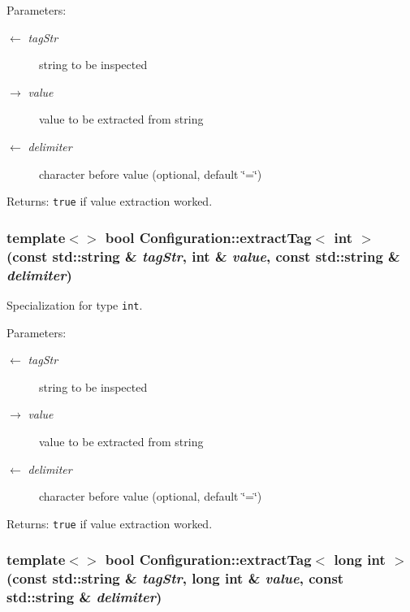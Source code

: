 \begin{Desc}
\item[Parameters:]
\begin{description}
\item[\mbox{$\leftarrow$} {\em tag\-Str}]string to be inspected \item[\mbox{$\rightarrow$} {\em value}]value to be extracted from string \item[\mbox{$\leftarrow$} {\em delimiter}]character before value (optional, default \char`\"{}=\char`\"{})\end{description}
\end{Desc}
\begin{Desc}
\item[Returns:]{\tt true} if value extraction worked. \end{Desc}
\hypertarget{namespaceConfiguration_76bd2eb20a53277e56bb0149ef306281}{
\subsubsection[extractTag]{\setlength{\rightskip}{0pt plus 5cm}template$<$$>$ bool Configuration::extract\-Tag$<$ int $>$ (const std::string \& {\em tag\-Str}, int \& {\em value}, const std::string \& {\em delimiter})}}
\label{namespaceConfiguration_76bd2eb20a53277e56bb0149ef306281}


Specialization for type {\tt int}. 

\begin{Desc}
\item[Parameters:]
\begin{description}
\item[\mbox{$\leftarrow$} {\em tag\-Str}]string to be inspected \item[\mbox{$\rightarrow$} {\em value}]value to be extracted from string \item[\mbox{$\leftarrow$} {\em delimiter}]character before value (optional, default \char`\"{}=\char`\"{})\end{description}
\end{Desc}
\begin{Desc}
\item[Returns:]{\tt true} if value extraction worked. \end{Desc}
\hypertarget{namespaceConfiguration_98cb275ddb4af5ad9a8436ea7436d370}{
\subsubsection[extractTag]{\setlength{\rightskip}{0pt plus 5cm}template$<$$>$ bool Configuration::extract\-Tag$<$ long int $>$ (const std::string \& {\em tag\-Str}, long int \& {\em value}, const std::string \& {\em delimiter})}}
\label{namespaceConfiguration_98cb275ddb4af5ad9a8436ea7436d370}



